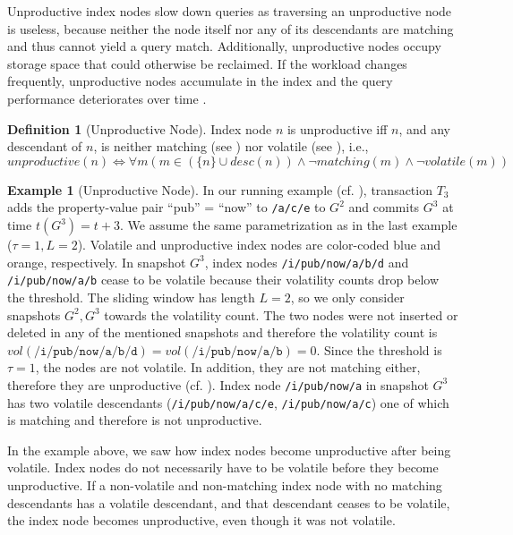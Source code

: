 \documentclass[abstracton,12pt]{scrartcl}
\theoremstyle{definition}
\newtheorem{definition}{Definition}
\newtheorem{example}{Example}
\begin{document}
Unproductive index nodes slow down
queries as traversing an unproductive node is useless, because neither the node
itself nor any of its descendants are matching and thus cannot
yield a query match. Additionally, unproductive nodes occupy storage space that
could otherwise be reclaimed. If the workload changes frequently, unproductive
nodes accumulate in the index and the query performance deteriorates
over time \cite{KW17}.

\begin{definition}[Unproductive Node]
  Index node $n$ is unproductive iff $n$, and any descendant of
  $n$, is neither matching (see ) nor volatile (see
  ), i.e.,
  $$ unproductive(n) \iff \forall  m (m \in (\{n\} \cup desc(n)) \land
  \neg matching(m) \land \neg volatile(m))$$
  \label{def:unproductive-node}
\end{definition}

\vspace{-0.5cm}

\begin{example}[Unproductive Node]
  In our running example (cf. ), transaction $T_3$ adds
  the property-value pair ``pub'' = ``now'' to \texttt{/a/c/e} to $G^2$ and commits $G^3$ at time
  $t(G^3) = t+3$. We assume the same parametrization as in the last example
  ($\tau = 1, L = 2$). Volatile and unproductive index nodes are color-coded
  blue and orange, respectively.
  In snapshot $G^3$, index nodes \texttt{/i/pub/now/a/b/d} and
  \texttt{/i/pub/now/a/b} cease to be volatile because their 
  volatility counts drop below the threshold. The sliding window has length $L =
  2$, so we only consider snapshots $G^2,G^3$ towards the volatility count. The two
  nodes were not inserted or deleted in any of the mentioned snapshots and
  therefore the volatility count is $vol(\texttt{/i/pub/now/a/b/d}) =
  vol(\texttt{/i/pub/now/a/b}) = 0$. Since the threshold is $\tau = 1$, the nodes are
  not volatile. In addition,
  they are not matching either, therefore they are unproductive (cf.
  ). Index node
  \texttt{/i/pub/now/a} in snapshot $G^3$ has
  two volatile descendants (\texttt{/i/pub/now/a/c/e}, \texttt{/i/pub/now/a/c}) 
  one of which is matching and therefore is not unproductive.
  \label{ex:unproductive-node}
\end{example}

In the example above, we saw how index nodes become unproductive after being
volatile. Index nodes do not necessarily have to be volatile before they become
unproductive.
If a non-volatile and non-matching index node with no matching descendants has a
volatile descendant, and that descendant ceases to
be volatile, the index node becomes unproductive, even though it was not
volatile.
\end{document}
